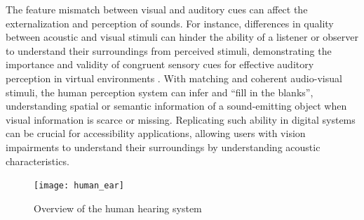 The feature mismatch between visual and auditory cues can affect the externalization and perception of sounds. For instance, differences in quality between acoustic and visual stimuli can hinder the ability of a listener or observer to understand their surroundings from perceived stimuli, demonstrating the importance and validity of congruent sensory cues for effective auditory perception in virtual environments \citep{bonneel2010bimodal}.
With matching and coherent audio-visual stimuli, the human perception system can infer and ``fill in the blanks'', understanding spatial or semantic information of a sound-emitting object when visual information is scarce or missing. Replicating such ability in digital systems can be crucial for accessibility applications, allowing users with vision impairments to understand their surroundings by understanding acoustic characteristics.

\begin{figure}
    \centering
    \texttt{[image: human\_ear]}
    \caption[Overview of the human hearing system]{Overview of the human hearing system \citep{zwicker2013psychoacoustics}}
    \label{fig:human_hearing_system}
\end{figure}

